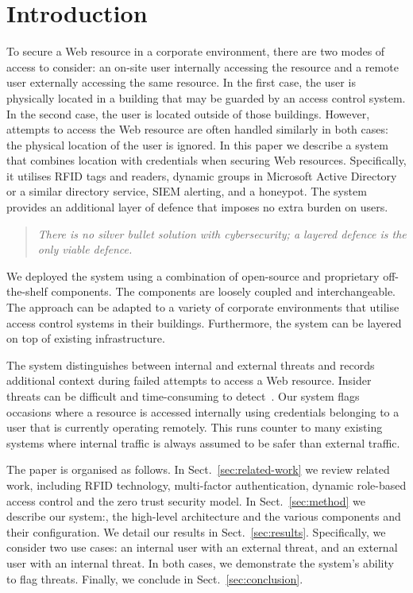 \section{Introduction}\label{sec:introduction}

To secure a Web resource in a corporate environment, there are two
modes of access to consider: an on-site user internally accessing the
resource and a remote user externally accessing the same resource.  In
the first case, the user is physically located in a building that may
be guarded by an access control system.  In the second case, the user
is located outside of those buildings.  However, attempts to access
the Web resource are often handled similarly in both cases: the
physical location of the user is ignored.  In this paper we describe a
system that combines location with credentials when securing Web
resources.  Specifically, it utilises RFID tags and readers, dynamic
groups in Microsoft Active Directory or a similar directory service,
SIEM alerting, and a honeypot.  The system provides an additional
layer of defence that imposes no extra burden on users.

\begin{quote}
  \em{There is no silver bullet solution with cybersecurity; a layered
    defence is the only viable defence.}

\end{quote}

We deployed the system using a combination of open-source and
proprietary off-the-shelf components.  The components are loosely
coupled and interchangeable.  The approach can be adapted to a variety
of corporate environments that utilise access control systems in their
buildings.  Furthermore, the system can be layered on top of existing
infrastructure.

The system distinguishes between internal and external threats and
records additional context during failed attempts to access a Web
resource.  Insider threats can be difficult and time-consuming to
detect~\cite{liu-et-al-18}.  Our system flags occasions where a
resource is accessed internally using credentials belonging to a user
that is currently operating remotely.  This runs counter to many
existing systems where internal traffic is always assumed to be safer
than external traffic.

The paper is organised as follows.  In Sect.~\ref{sec:related-work} we
review related work, including RFID technology, multi-factor
authentication, dynamic role-based access control and the zero trust
security model.  In Sect.~\ref{sec:method} we describe our system:,
the high-level architecture and the various components and their
configuration.  We detail our results in Sect.~\ref{sec:results}.
Specifically, we consider two use cases: an internal user with an
external threat, and an external user with an internal threat.  In
both cases, we demonstrate the system's ability to flag threats.
Finally, we conclude in Sect.~\ref{sec:conclusion}.
